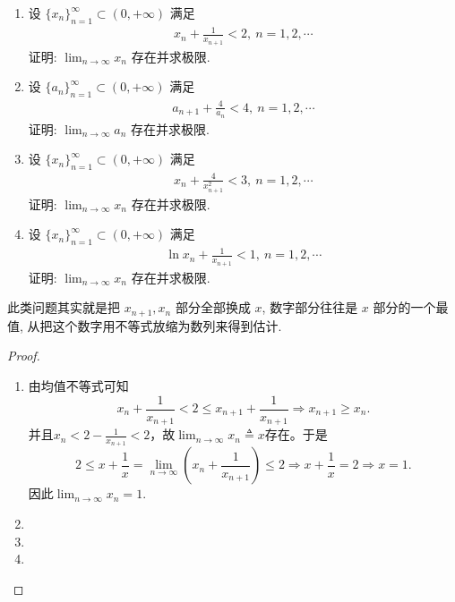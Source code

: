\documentclass[../../main.tex]{subfiles}%
\begin{document}
\begin{example}
\begin{enumerate}
\item 设 $\{x_n\}_{n=1}^{\infty} \subset (0,+\infty)$ 满足
\begin{align*}
x_n + \frac{1}{x_{n+1}} < 2,\ n = 1,2,\cdots
\end{align*}
证明: $\lim_{n \to \infty} x_n$ 存在并求极限.
\item 设 $\{a_n\}_{n=1}^{\infty} \subset (0,+\infty)$ 满足
\begin{align*}
a_{n+1} + \frac{4}{a_n} < 4,\ n = 1,2,\cdots
\end{align*}
证明: $\lim_{n \to \infty} a_n$ 存在并求极限.
\item 设 $\{x_n\}_{n=1}^{\infty} \subset (0,+\infty)$ 满足
\begin{align*}
x_n + \frac{4}{x_{n+1}^2} < 3,\ n = 1,2,\cdots
\end{align*}
证明: $\lim_{n \to \infty} x_n$ 存在并求极限.
\item 设 $\{x_n\}_{n=1}^{\infty} \subset (0,+\infty)$ 满足
\begin{align*}
\ln x_n + \frac{1}{x_{n+1}} < 1,\ n = 1,2,\cdots
\end{align*}
证明: $\lim_{n \to \infty} x_n$ 存在并求极限.
\end{enumerate}
\end{example}
\begin{note}
此类问题其实就是把 $x_{n+1}, x_n$ 部分全部换成 $x$, 数字部分往往是 $x$ 部分的一个最值, 从把这个数字用不等式放缩为数列来得到估计.
\end{note}
\begin{proof}
\begin{enumerate}
\item 由均值不等式可知
$$x_n + \frac{1}{x_{n+1}} < 2 \leqslant x_{n+1} + \frac{1}{x_{n+1}} \Rightarrow x_{n+1} \geqslant x_n.$$
并且$x_n < 2 - \frac{1}{x_{n+1}} < 2$，故$\lim_{n \to \infty} x_n \triangleq x$存在。于是
$$2 \leqslant x + \frac{1}{x} = \lim_{n \to \infty} \left( x_n + \frac{1}{x_{n+1}} \right) \leqslant 2 \Rightarrow x + \frac{1}{x} = 2 \Rightarrow x = 1.$$
因此$\lim_{n \to \infty} x_n = 1.$

\item 

\item 

\item 
\end{enumerate}

\end{proof}
\end{document}
